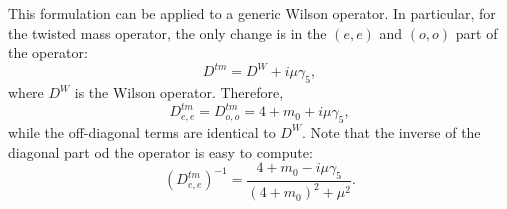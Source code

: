 \documentclass{article}
\begin{document}
This formulation can be applied to a generic Wilson operator. In particular, for the twisted mass operator, the only change is in the $(e,e)$ and $(o,o)$ part of the operator:
\begin{equation}
    D^{tm} = D^W + i \mu \gamma_5, 
\end{equation}
where $D^W$ is the Wilson operator. Therefore,
\begin{equation}
    D^{tm}_{e,e} = D^{tm}_{o,o} = 4 + m_0 + i \mu \gamma_5,
\end{equation}
while the off-diagonal terms are identical to $D^W$. Note that the inverse of the diagonal part od the operator is easy to compute:
\begin{equation}
    (D^{tm}_{e,e})^{-1} =\frac{ 4 + m_0 - i \mu \gamma_5}{(4+m_0)^2 + \mu^2}.
\end{equation}
\end{document}
